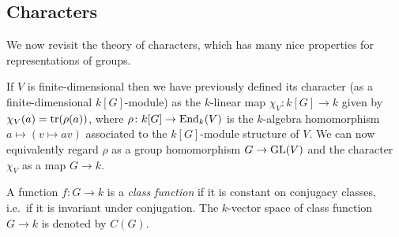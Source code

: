 \subsection{Characters}


\begin{fluff}
  We now revisit the theory of characters, which has many nice properties for representations of groups.
  
  If $V$ is finite-dimensional then we have previously defined its character (as a finite-dimensional $k[G]$-module) as the $k$-linear map $\chi_V \colon k[G] \to k$ given by $\chi_V(a) = \operatorname{tr}(\rho(a))$, where $\rho \colon k[G] \to \operatorname{End}_k(V)$ is the $k$-algebra homomorphism $a \mapsto (v \mapsto av)$ associated to the $k[G]$-module structure of $V$.
  We can now equivalently regard $\rho$ as a group homomorphism $G \to \operatorname{GL}(V)$ and the character $\chi_V$ as a map $G \to k$.
\end{fluff}


% 
% 


\begin{definition}
  A function $f \colon G \to k$ is a \emph{class function} if it is constant on conjugacy classes, i.e.\ if it is invariant under conjugation.
  The $k$-vector space of class function $G \to k$ is denoted by $C(G)$.
\end{definition}


